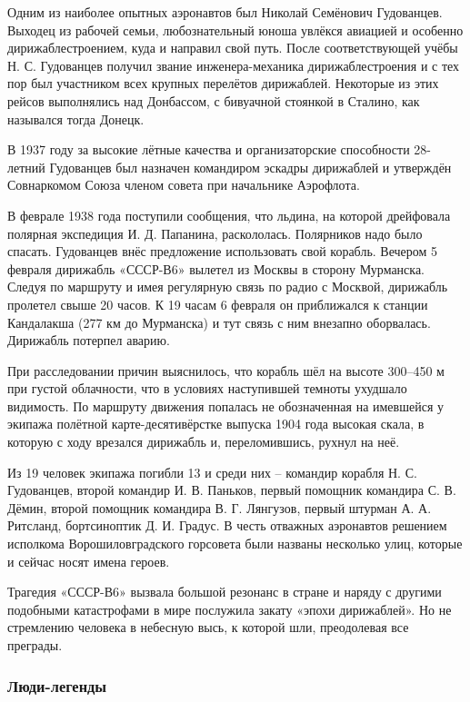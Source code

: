 Одним из наиболее опытных аэронавтов был Николай Семёнович Гудованцев. Выходец
из рабочей семьи, любознательный юноша увлёкся авиацией и особенно
дирижаблестроением, куда и направил свой путь. После соответствующей учёбы Н.
С. Гудованцев получил звание инженера-механика дирижаблестроения и с тех пор
был участником всех крупных перелётов дирижаблей. Некоторые из этих рейсов
выполнялись над Донбассом, с бивуачной стоянкой в Сталино, как назывался тогда
Донецк. 

В 1937 году за высокие лётные качества и организаторские способности 28-летний
Гудованцев был назначен командиром эскадры дирижаблей и утверждён Совнаркомом
Союза членом совета при начальнике Аэрофлота.

В феврале 1938 года поступили сообщения, что льдина, на которой дрейфовала
полярная экспедиция И. Д. Папанина, раскололась. Полярников надо было спасать.
Гудованцев внёс предложение использовать свой корабль. Вечером 5 февраля
дирижабль «СССР-В6» вылетел из Москвы в сторону Мурманска. Следуя по маршруту и
имея регулярную связь по радио с Москвой, дирижабль пролетел свыше 20 часов. К
19 часам 6 февраля он приближался к станции Кандалакша (277 км до Мурманска) и
тут связь с ним внезапно оборвалась. Дирижабль потерпел аварию. 

При расследовании причин выяснилось, что корабль шёл на высоте 300–450 м при
густой облачности, что в условиях наступившей темноты ухудшало видимость. По
маршруту движения попалась не обозначенная на имевшейся у экипажа полётной
карте-десятивёрстке выпуска 1904 года высокая скала, в которую с ходу врезался
дирижабль и, переломившись, рухнул на неё. 

Из 19 человек экипажа погибли 13 и среди них – командир корабля Н. С.
Гудованцев, второй командир И. В. Паньков, первый помощник командира С. В.
Дёмин, второй помощник командира В. Г. Лянгузов, первый штурман А. А. Ритсланд,
бортсиноптик Д. И. Градус. В честь отважных аэронавтов решением исполкома
Ворошиловградского горсовета были названы несколько улиц, которые и сейчас
носят имена героев.

Трагедия «СССР-В6» вызвала большой резонанс в стране и наряду с другими
подобными катастрофами в мире послужила закату «эпохи дирижаблей». Но не
стремлению человека в небесную высь, к которой шли, преодолевая все преграды.

\subsubsection{Люди-легенды}

